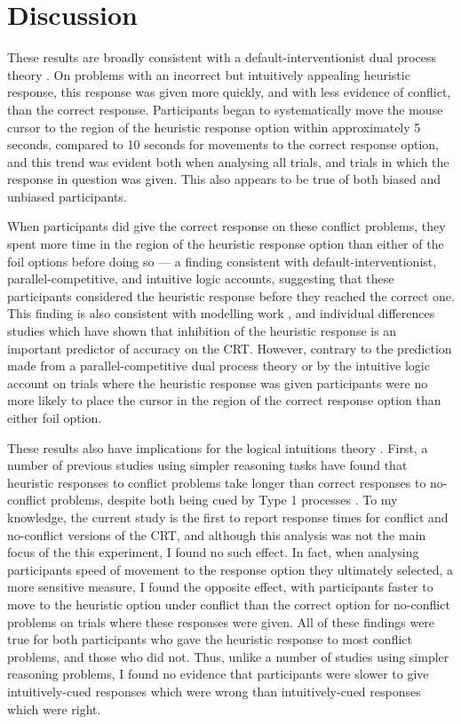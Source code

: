
\section{Discussion}

These results are broadly consistent with
a default-interventionist dual process theory
\citep{Evans2006,Kahneman2005}.
On problems with an incorrect but intuitively appealing heuristic response,
this response was given more quickly,
and with less evidence of conflict,
than the correct response.
Participants began to systematically move the mouse cursor
to the region of the heuristic response option within approximately 5 seconds,
compared to 10 seconds for movements to the correct response option,
and this trend was evident both when analysing all trials,
and trials in which the response in question was given.
This also appears to be true of both biased and unbiased participants. 

When participants did give the correct response on these conflict problems,
they spent more time in the region of the heuristic response option
than either of the foil options before doing so ---
a finding consistent with default-interventionist,
parallel-competitive, and intuitive logic accounts,
suggesting that these participants considered the heuristic response
before they reached the correct one.
This finding is also consistent with modelling work
\citep{Bockenholt2012,Campitelli2013},
and individual differences studies \citep{Liberali2012}
which have shown that inhibition of the heuristic response
is an important predictor of accuracy on the CRT.
However, contrary to the prediction made from
a parallel-competitive dual process theory
\citep{Sloman1996,Sloman2014}
or by the intuitive logic account
\citep{DeNeys2014a,DeNeys2012,Handley2015}
on trials where the heuristic response was given
participants were no more likely to place the cursor
in the region of the correct response option than either foil option.

These results also have implications for the logical intuitions theory
\citep{DeNeys2012,DeNeys2014a}.
First, a number of previous studies using simpler reasoning tasks
have found that heuristic responses to conflict problems take longer
than correct responses to no-conflict problems,
despite both being cued by Type 1 processes
\citep{DeNeys2008,Stupple2008}.
To my knowledge, the current study is the first to report response times
for conflict and no-conflict versions of the CRT,
and although this analysis was not the main focus of the this experiment,
I found no such effect.
In fact, when analysing participants speed of movement
to the response option they ultimately selected, a more sensitive measure,
I found the opposite effect,
with participants faster to move to the heuristic option under conflict
than the correct option for no-conflict problems
on trials where these responses were given.
All of these findings were true for both
participants who gave the heuristic response to most conflict problems,
and those who did not.
Thus, unlike a number of studies using simpler reasoning problems,
I found no evidence that participants were slower
to give intuitively-cued responses which were wrong
than intuitively-cued responses which were right.

